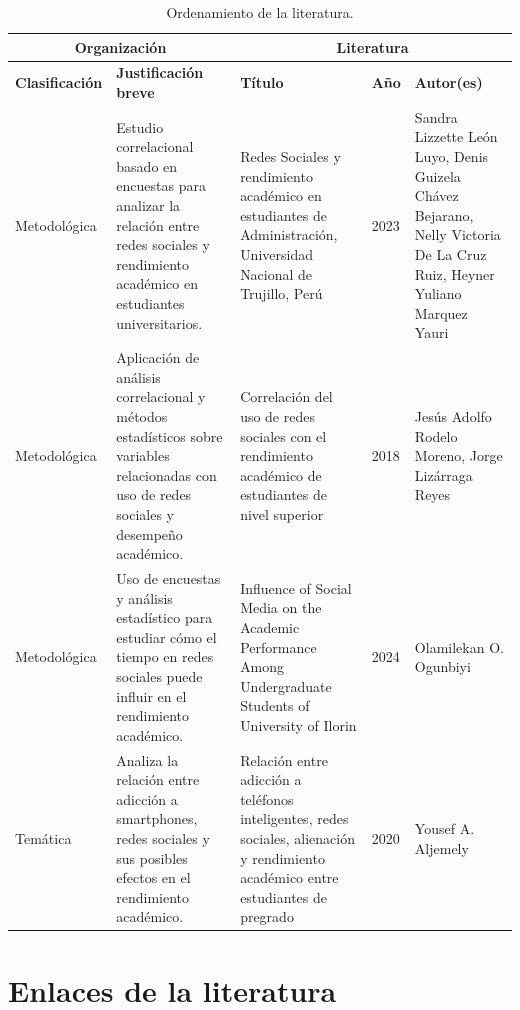 \documentclass[12pt]{article}
\begin{document}
\begin{table}[h]
\small
\renewcommand{\arraystretch}{1.3}
\begin{tabular}{|p{2.5cm}|p{4cm}|p{4.8cm}|p{1.2cm}|p{3cm}|}
\hline
\multicolumn{2}{|c|}{\textbf{Organización}} & 
\multicolumn{3}{c|}{\textbf{Literatura}} \\
\hline

\textbf{Clasificación} & 
\textbf{Justificación breve} & 
\textbf{Título} & 
\textbf{Año} & 
\textbf{Autor(es)} \\
\hline

Metodológica & 
Estudio correlacional basado en encuestas para analizar la relación entre redes sociales y rendimiento académico en estudiantes universitarios. & 
Redes Sociales y rendimiento académico en estudiantes de Administración, Universidad Nacional de Trujillo, Perú & 
2023 & 
Sandra Lizzette León Luyo, Denis Guizela Chávez Bejarano, Nelly Victoria De La Cruz Ruiz, Heyner Yuliano Marquez Yauri \\
\hline

Metodológica & 
Aplicación de análisis correlacional y métodos estadísticos sobre variables relacionadas con uso de redes sociales y desempeño académico. & 
Correlación del uso de redes sociales con el rendimiento académico de estudiantes de nivel superior & 
2018 & 
Jesús Adolfo Rodelo Moreno, Jorge Lizárraga Reyes \\
\hline

Metodológica & 
Uso de encuestas y análisis estadístico para estudiar cómo el tiempo en redes sociales puede influir en el rendimiento académico. & 
Influence of Social Media on the Academic Performance Among Undergraduate Students of University of Ilorin & 
2024 & 
Olamilekan O. Ogunbiyi \\
\hline

Temática & 
Analiza la relación entre adicción a smartphones, redes sociales y sus posibles efectos en el rendimiento académico. & 
Relación entre adicción a teléfonos inteligentes, redes sociales, alienación y rendimiento académico entre estudiantes de pregrado & 
2020 & 
Yousef A. Aljemely \\
\hline

\end{tabular}
\caption{Ordenamiento de la literatura.}
\end{table}

\section{Enlaces de la literatura}
\end{document}
